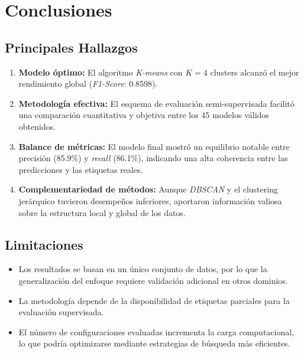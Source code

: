 \documentclass[12pt,a4paper]{article}
\begin{document}
\vspace{2em}

\section{Conclusiones}

\subsection{Principales Hallazgos}

\begin{enumerate}
    \item \textbf{Modelo óptimo:} El algoritmo \textit{K-means} con $K=4$ clusters alcanzó el mejor rendimiento global (\textit{F1-Score}: 0.8598).
    \item \textbf{Metodología efectiva:} El esquema de evaluación semi-supervisada facilitó una comparación cuantitativa y objetiva entre los 45 modelos válidos obtenidos.
    \item \textbf{Balance de métricas:} El modelo final mostró un equilibrio notable entre precisión (85.9\%) y \textit{recall} (86.1\%), indicando una alta coherencia entre las predicciones y las etiquetas reales.
    \item \textbf{Complementariedad de métodos:} Aunque \textit{DBSCAN} y el clustering jerárquico tuvieron desempeños inferiores, aportaron información valiosa sobre la estructura local y global de los datos.
\end{enumerate}

\vspace{1em}

\subsection{Limitaciones}

\begin{itemize}
    \item Los resultados se basan en un único conjunto de datos, por lo que la generalización del enfoque requiere validación adicional en otros dominios.
    \item La metodología depende de la disponibilidad de etiquetas parciales para la evaluación supervisada.
    \item El número de configuraciones evaluadas incrementa la carga computacional, lo que podría optimizarse mediante estrategias de búsqueda más eficientes.
\end{itemize}
\end{document}
